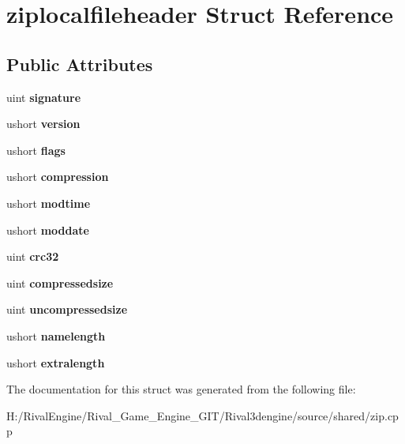 \hypertarget{structziplocalfileheader}{}\section{ziplocalfileheader Struct Reference}
\label{structziplocalfileheader}
\subsection*{Public Attributes}
\begin{DoxyCompactItemize}
\item 
\mbox{\label{structziplocalfileheader_a22cc303163038d4ec46b9a162d3f9421}} 
uint {\bfseries signature}
\item 
\mbox{\label{structziplocalfileheader_a9d4379c9859656bfab2229e3d5194c57}} 
ushort {\bfseries version}
\item 
\mbox{\label{structziplocalfileheader_aec80c37c0501f893a9aa984bdb4d57a8}} 
ushort {\bfseries flags}
\item 
\mbox{\label{structziplocalfileheader_a372c8cd5143c7e0375f944a51a2b84fe}} 
ushort {\bfseries compression}
\item 
\mbox{\label{structziplocalfileheader_ab5ba3fd9cf50d21552ba39209b636b98}} 
ushort {\bfseries modtime}
\item 
\mbox{\label{structziplocalfileheader_a9566bfbc65312deee266b75121b2e639}} 
ushort {\bfseries moddate}
\item 
\mbox{\label{structziplocalfileheader_add50c78669012f626f21e15dc8296e4c}} 
uint {\bfseries crc32}
\item 
\mbox{\label{structziplocalfileheader_a438bf6aa457e3899e043b78a59a08659}} 
uint {\bfseries compressedsize}
\item 
\mbox{\label{structziplocalfileheader_aadea4a2d2dca71d769b60df88353f7d4}} 
uint {\bfseries uncompressedsize}
\item 
\mbox{\label{structziplocalfileheader_accec1aeae460ae060f68a5a08391178f}} 
ushort {\bfseries namelength}
\item 
\mbox{\label{structziplocalfileheader_a44b7072908372a9b4051b074d3e88a9c}} 
ushort {\bfseries extralength}
\end{DoxyCompactItemize}


The documentation for this struct was generated from the following file\+:\begin{DoxyCompactItemize}
\item 
H\+:/\+Rival\+Engine/\+Rival\+\_\+\+Game\+\_\+\+Engine\+\_\+\+G\+I\+T/\+Rival3dengine/source/shared/zip.\+cpp\end{DoxyCompactItemize}
